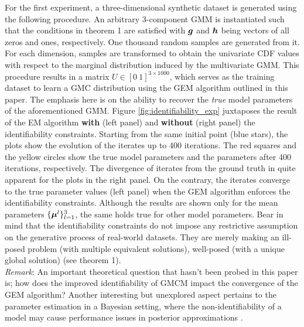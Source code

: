\documentclass{article}
\begin{document}
For the first experiment, a three-dimensional synthetic dataset is generated using the following procedure. An arbitrary $3$-component GMM is instantiated such that the conditions in theorem 1 are satisfied with $\boldsymbol{g}$ and $\boldsymbol{h}$ being vectors of all zeros and ones, respectively. One thousand random samples are generated from it. For each dimension, samples are transformed to obtain the univariate CDF values with respect to the marginal distribution induced by the multivariate GMM. This procedure results in a matrix $U \in [0 \ 1]^{3\times 1000}$, which serves as the training dataset to learn a GMC distribution using the GEM algorithm outlined in this paper. The emphasis here is on the ability to recover the \emph{true} model parameters of the aforementioned GMM. Figure \ref{fig:identifiability_exp} juxtaposes the result of the EM algorithm \textbf{with} (left panel) and \textbf{without} (right panel) the identifiability constraints. Starting from the same initial point (blue stars), the plots show the evolution of the iterates up to 400 iterations. The red squares and the yellow circles show the true model parameters and the parameters after 400 iterations, respectively. The divergence of iterates from the ground truth in quite apparent for the plots in the right panel. On the contrary, the iterates converge to the true parameter values (left panel) when the GEM algorithm enforces the identifiability constraints. Although the results are shown only for the mean parameters $\{\boldsymbol{\mu}^l \}_{l=1}^3$, the same holds true for other model parameters. Bear in mind that the identifiability constraints do not impose any restrictive assumption on the generative process of real-world datasets. They are merely making an ill-posed problem (with multiple equivalent solutions), well-posed (with a unique global solution) (see theorem 1). \\

\emph{Remark}: An important theoretical question that hasn't been probed in this paper is; how does the improved identifiability of GMCM impact the convergence of the GEM algorithm? Another interesting but unexplored aspect pertains to the parameter estimation in a Bayesian setting, where the non-identifiability of a model may cause performance issues in posterior approximations \citep[see][]{Neath1997}.
\end{document}
